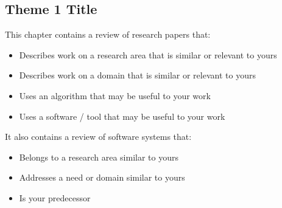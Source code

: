 \begin{comment}

%
%
Guide on Writing your RRL chapter
 
1. Identify the keywords with respect to your research
      One keyword = One document section
                Examples: 2.1 Story Generation Systems
			 2.2 Knowledge Representation

2.  Find references using these keywords

3.  For each of the references that you find,
        Check: Is it relevant to your research?
        Use their references to find more relevant works.

4. Identify a set of criteria for comparison.
       It will serve as a guide to help you focus on what to look for

5. Write a summary focusing on -
       What: A short description of the work
       How: A summary of the approach it utilized
       Findings: If applicable, provide the results
        Why: Relevance to your work

6. At the end of each section,  show a Table of Comparison of the related works 
   and your proposed project/system

\end{comment}

\subsection{Theme 1 Title}
This chapter  contains a review of research papers that:
%
%
\begin{itemize}
\item Describes work on a research area that is similar or relevant to yours
\item Describes work on a domain that is similar or relevant to yours
\item Uses an algorithm that may be useful to your work
\item Uses a software / tool that may be useful to your work
\end{itemize}

It also contains a review of software systems that:
%
%
\begin{itemize}
   \item Belongs to a research area similar to yours
   \item Addresses a need or domain similar to yours
   \item Is your predecessor
\end{itemize}

